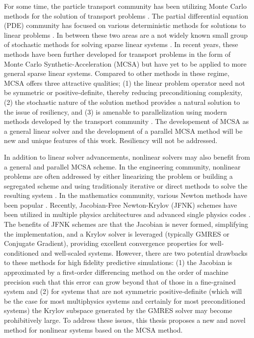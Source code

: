 For some time, the particle transport community has been utilizing
Monte Carlo methods for the solution of transport problems
\citep{lewis_1993}. The partial differential equation (PDE) community
has focused on various deterministic methods for solutions to linear
problems \citep{saad_2003}. In between these two areas are a not widely
known small group of stochastic methods for solving sparse linear
systems \citep{hammersley_1964, halton_1962, halton_1994}. In recent
years, these methods have been further developed for transport
problems in the form of Monte Carlo Synthetic-Acceleration (MCSA)
\citep{evans_2003, evans_2009} but have yet to be applied to more
general sparse linear systems. Compared to other methods in these
regime, MCSA offers three attractive qualities; (1) the linear problem
operator need not be symmetric or positive-definite, thereby reducing
preconditioning complexity, (2) the stochastic nature of the
solution method provides a natural solution to the issue of resiliency,
and (3) is amenable to parallelization using modern methods developed by
the transport community \citep{wagner_2011}. The developement of MCSA
as a general linear solver and the development of a parallel MCSA
method will be new and unique features of this work. Resiliency will
not be addressed.

In addition to linear solver advancements, nonlinear solvers may also
benefit from a general and parallel MCSA scheme. In the engineering
community, nonlinear problems are often addressed by either
linearizing the problem or building a segregated scheme and using
traditionaly iterative or direct methods to solve the resulting
system \citep{tannehill_1997}. In the mathematics community, various
Newton methods have been popular \citep{kelley_1995}. Recently,
Jacobian-Free Newton-Krylov (JFNK) schemes \citep{knoll_2004} have
been utilized in multiple physics architectures and advanced single
physics codes \citep{gaston_2009}. The benefits of JFNK schemes are
that the Jacobian is never formed, simplifying the implementation, and
a Krylov solver is leveraged (typically GMRES or Conjugate Gradient),
providing excellent convergence properties for well-conditioned and
well-scaled systems. However, there are two potential drawbacks to
these methods for high fidelity predictive simulations: (1) the
Jacobian is approximated by a first-order differencing method on the
order of machine precision such that this error can grow beyond that
of those in a fine-grained system and (2) for systems that are not
symmetric positive-definite (which will be the case for most
multiphysics systems and certainly for most preconditioned systems)
the Krylov subspace generated by the GMRES solver may become
prohibitively large. To address these issues, this thesis proposes a
new and novel method for nonlinear systems based on the MCSA method.

